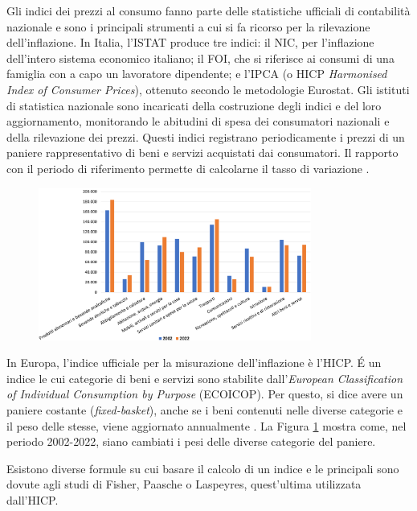 Gli indici dei prezzi al consumo fanno parte delle statistiche ufficiali di contabilità nazionale e sono i principali strumenti a cui si fa ricorso per la rilevazione dell'inflazione. In Italia, l'ISTAT produce tre indici: il NIC, per l'inflazione dell'intero sistema economico italiano; il FOI, che si riferisce ai consumi di una famiglia con a capo un lavoratore dipendente; e l'IPCA (o HICP \textit{Harmonised Index of Consumer Prices}), ottenuto secondo le metodologie Eurostat. Gli istituti di statistica nazionale sono incaricati della costruzione degli indici e del loro aggiornamento, monitorando le abitudini di spesa dei consumatori nazionali e della rilevazione dei prezzi. Questi indici registrano periodicamente i prezzi di un paniere rappresentativo di beni e servizi acquistati dai consumatori.  Il rapporto con il periodo di riferimento permette di calcolarne il tasso di variazione \parencite{ISTAT:indici}.

\begin{figure}[h]
	\centering
	\includegraphics[width=0.80\textwidth]{img/istat_pesi_paniere_2002_2022.pdf}
	\caption{}
	\label{img:istat_pesi_paniere_2002_2022}
\end{figure}

In Europa, l'indice ufficiale per la misurazione dell'inflazione è l'HICP. \'E un indice le cui categorie di beni e servizi sono stabilite dall'\textit{European Classification of Individual Consumption by Purpose} (ECOICOP). Per questo, si dice avere un paniere costante (\textit{fixed-basket}), anche se i beni contenuti nelle diverse categorie e il peso delle stesse, viene aggiornato annualmente \parencite{ECB:measuring_inflation}. La Figura \ref{img:istat_pesi_paniere_2002_2022} mostra come, nel periodo 2002-2022, siano cambiati i pesi delle diverse categorie del paniere.

Esistono diverse formule su cui basare il calcolo di un indice e le principali sono dovute agli studi di Fisher, Paasche o Laspeyres, quest'ultima utilizzata dall'HICP.

